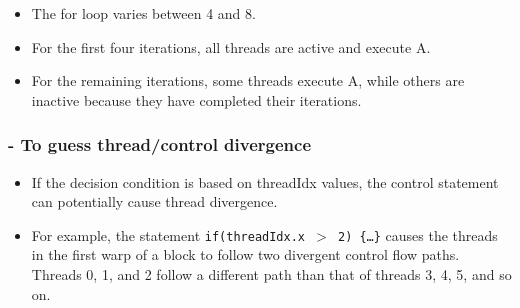 \begin{itemize}
    \item The for loop varies between 4 and 8.
    \item For the first four iterations, all threads are active and execute A.
    \item For the remaining iterations, some threads execute A, while others are inactive because they have completed their iterations.
\end{itemize}

\subsubsection{- To guess thread/control divergence}
\begin{itemize}
    \item If the decision condition is based on threadIdx values, the control statement can potentially cause thread divergence.
    \item For example, the statement \texttt{if(threadIdx.x $>$ 2) \{\dots\}} causes the threads in the first warp of a block to follow two divergent control flow paths.
          \subitem Threads 0, 1, and 2 follow a different path than that of threads 3, 4, 5, and so on.
\end{itemize}

